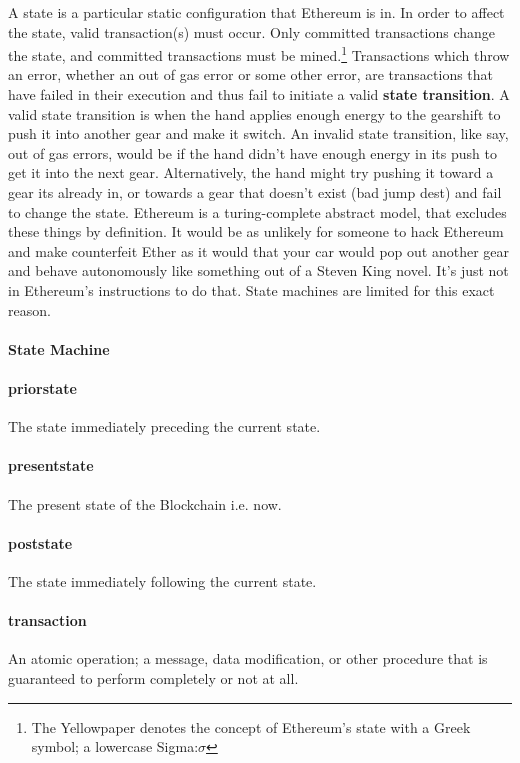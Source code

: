 \documentclass[11pt,a4paper,leqno,bibliography=totoc]{scrartcl}
\newenvironment{alphafootnotes}
    {\par\edef\savedfootnotenumber{\number\value{footnote}}
    \renewcommand{\thefootnote}{\alph{footnote}}
     \setcounter{footnote}{0}}
    {\par\setcounter{footnote}{\savedfootnotenumber}}
\begin{document}
\begin{alphafootnotes}
\begin{multicols}{2}
A state is a particular static configuration that Ethereum is in. In order to affect the state, valid \gls{transaction}(s) must occur.  Only committed transactions change the state, and committed transactions must be mined.\footnote{The Yellowpaper denotes the concept of Ethereum's state with a Greek symbol; a lowercase Sigma:$\sigma$} Transactions which throw an error, whether an out of gas error or some other error, are transactions that have failed in their execution and thus fail to initiate a valid \textbf{state transition}. A valid state transition is when the hand applies enough energy to the gearshift to push it into another gear and make it switch. An invalid state transition, like say, out of gas errors, would be if the hand didn't have enough energy in its push to get it into the next gear.  Alternatively, the hand might try pushing it toward a gear its already in, or towards a gear that doesn't exist (bad jump dest) and fail to change the state. Ethereum is a \gls{turing-complete} \gls{abstract} model, that excludes these things by definition. It would be as unlikely for someone to hack Ethereum and make counterfeit Ether as it would that your car would pop out another gear and behave autonomously like something out of a Steven King novel. It's just not in Ethereum's instructions to do that. State machines are limited for this exact reason.


\paragraph{State Machine}

    \paragraph{priorstate} The state immediately preceding the current state.
    \paragraph{presentstate} The present state of the Blockchain i.e. now.
    \paragraph{poststate} The state immediately following the current state.

     \paragraph{transaction}An atomic operation; a message, data modification, or other procedure that is guaranteed to perform completely or not at all.

\end{multicols}
\end{alphafootnotes}
\end{document}
